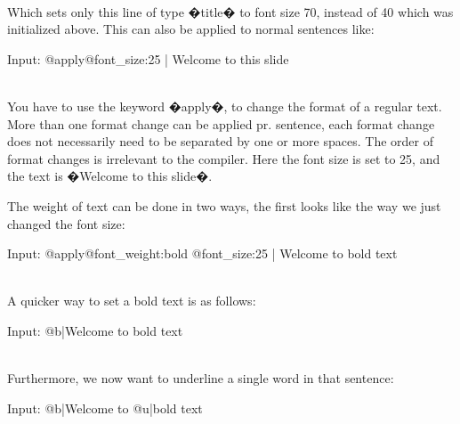 \begin{spverbatim}
Input: @title\{@font_size:70 |Hello and welcome}
\end{spverbatim}

 \\


Which sets only this line of type �title� to font size 70, instead of 40 which was initialized above.
This can also be applied to normal sentences like:\\

\begin{spverbatim}
Input: @apply{@font_size:25 | Welcome to this slide}
\end{spverbatim}

 \\

You have to use the keyword �apply�, to change the format of a regular text. More than one format change can be applied pr. sentence, each format change does not necessarily need to be separated by one or more spaces. The order of format changes is irrelevant to the compiler. Here the font size is set to 25, and the text is �Welcome to this slide�.

The weight of text can be done in two ways, the first looks like the way we just changed the font size:\\

\begin{spverbatim}
Input: @apply{@font_weight:bold @font_size:25 | Welcome to bold text}
\end{spverbatim}

 \\

A quicker way to set a bold text is as follows:\\

\begin{spverbatim}
Input: @b{|Welcome to bold text}
\end{spverbatim}

 \\

Furthermore, we now want to underline a single word in that sentence:\\

\begin{spverbatim}
Input: @b{|Welcome to @u{|bold} text}
\end{spverbatim}

